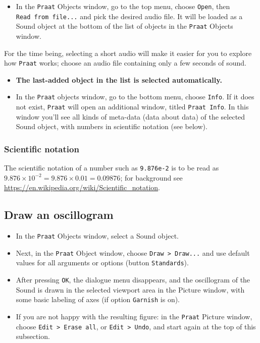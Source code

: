 \documentclass[
]{book}
\providecommand{\tightlist}{%
  \setlength{\itemsep}{0pt}\setlength{\parskip}{0pt}}
\begin{document}
\begin{itemize}
\tightlist
\item
  In the \texttt{Praat} Objects window, go to the top menu, choose \texttt{Open}, then \texttt{Read\ from\ file...} and pick the desired audio file. It will be loaded as a Sound object at the bottom of the list of objects in the \texttt{Praat} Objects window.
\end{itemize}

For the time being, selecting a short audio will make it easier for you to explore how \texttt{Praat} works; choose an audio file containing only a few seconds of sound.

\begin{itemize}
\item
  \textbf{The last-added object in the list is selected automatically.}
\item
  In the \texttt{Praat} objects window, go to the bottom menu, choose \texttt{Info}. If it does not exist, \texttt{Praat} will open an additional window, titled \texttt{Praat\ Info}. In this window you'll see all kinds of meta-data (data about data) of the selected Sound object, with numbers in scientific notation (see below).
\end{itemize}

\label{scientificnotation}
\subsubsection{Scientific notation}\label{sec:scientificnotation}

The scientific notation of a number such as \texttt{9.876e-2} is to be read as \(9.876 \times 10^{-2} = 9.876 \times 0.01 = 0.09876\); for background see \url{https://en.wikipedia.org/wiki/Scientific_notation}.

\label{box-draw}
\subsection{Draw an oscillogram}\label{draw-an-oscillogram}

\begin{itemize}
\item
  In the \texttt{Praat} Objects window, select a Sound object.
\item
  Next, in the \texttt{Praat} Object window, choose \texttt{Draw\ \textgreater{}\ Draw...} and use default values for all arguments or options (button \texttt{Standards}).
\item
  After pressing \texttt{OK}, the dialogue menu disappears, and the oscillogram of the Sound is drawn in the selected viewport area in the Picture window, with some basic labeling of axes (if option \texttt{Garnish} is on).
\item
  If you are not happy with the resulting figure: in the \texttt{Praat} Picture window, choose \texttt{Edit\ \textgreater{}\ Erase\ all}, or \texttt{Edit\ \textgreater{}\ Undo}, and start again at the top of this subsection.
\end{itemize}
\end{document}
